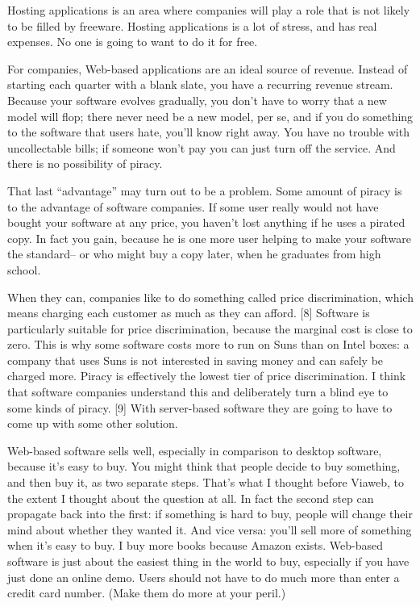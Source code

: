 Hosting applications is an area where companies will play a role that is
not likely to be filled by freeware. Hosting applications is a lot of
stress, and has real expenses. No one is going to want to do it for
free.

For companies, Web-based applications are an ideal source of revenue.
Instead of starting each quarter with a blank slate, you have a
recurring revenue stream. Because your software evolves gradually, you
don't have to worry that a new model will flop; there never need be a
new model, per se, and if you do something to the software that users
hate, you'll know right away. You have no trouble with uncollectable
bills; if someone won't pay you can just turn off the service. And there
is no possibility of piracy.

That last ``advantage'' may turn out to be a problem. Some amount of
piracy is to the advantage of software companies. If some user really
would not have bought your software at any price, you haven't lost
anything if he uses a pirated copy. In fact you gain, because he is one
more user helping to make your software the standard-- or who might buy
a copy later, when he graduates from high school.

When they can, companies like to do something called price
discrimination, which means charging each customer as much as they can
afford. {[}8{]} Software is particularly suitable for price
discrimination, because the marginal cost is close to zero. This is why
some software costs more to run on Suns than on Intel boxes: a company
that uses Suns is not interested in saving money and can safely be
charged more. Piracy is effectively the lowest tier of price
discrimination. I think that software companies understand this and
deliberately turn a blind eye to some kinds of piracy. {[}9{]} With
server-based software they are going to have to come up with some other
solution.

Web-based software sells well, especially in comparison to desktop
software, because it's easy to buy. You might think that people decide
to buy something, and then buy it, as two separate steps. That's what I
thought before Viaweb, to the extent I thought about the question at
all. In fact the second step can propagate back into the first: if
something is hard to buy, people will change their mind about whether
they wanted it. And vice versa: you'll sell more of something when it's
easy to buy. I buy more books because Amazon exists. Web-based software
is just about the easiest thing in the world to buy, especially if you
have just done an online demo. Users should not have to do much more
than enter a credit card number. (Make them do more at your peril.)

